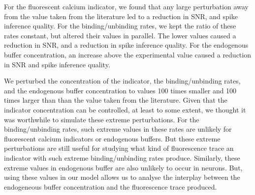 For the fluorescent calcium indicator, we found that any large perturbation away from the value taken from the literature led to a reduction in SNR, and spike inference quality. For the binding/unbinding rates, we kept the ratio of these rates constant, but altered their values in parallel. The lower values caused a reduction in SNR, and a reduction in spike inference quality. For the endogenous buffer concentration, an increase above the experimental value caused a reduction in SNR and spike inference quality.

We perturbed the concentration of the indicator, the binding/unbinding rates, and the endogenous buffer concentration to values 100 times smaller and 100 times larger than than the value taken from the literature. Given that the indicator concentration can be controlled, at least to some extent, we thought it was worthwhile to simulate these extreme perturbations. For the binding/unbinding rates, such extreme values in these rates are unlikely for fluorescent calcium indicators or endogenous buffers. But these extreme perturbations are still useful for studying what kind of fluorescence trace an indicator with such extreme binding/unbinding rates produce. Similarly, these extreme values in endogenous buffer are also unlikely to occur in neurons. But, using these values in our model allows us to analyse the interplay between the endogeneous buffer concentration and the fluorescence trace produced.

